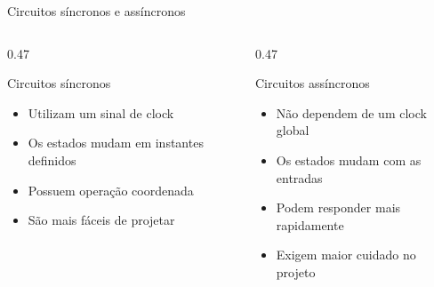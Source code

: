 \begin{frame}{Circuitos síncronos e assíncronos}

    \begin{columns}[T]

        \begin{column}{0.47\textwidth}
            \begin{alertblock}{Circuitos síncronos}
                \begin{itemize}
                    \item Utilizam um sinal de clock
                    \item Os estados mudam em instantes definidos
                    \item Possuem operação coordenada
                    \item São mais fáceis de projetar
                \end{itemize}
            \end{alertblock}
        \end{column}

        \begin{column}{0.47\textwidth}
            \begin{block}{Circuitos assíncronos}
                \begin{itemize}
                    \item Não dependem de um clock global
                    \item Os estados mudam com as entradas
                    \item Podem responder mais rapidamente
                    \item Exigem maior cuidado no projeto
                \end{itemize}
            \end{block}
        \end{column}

    \end{columns}

\end{frame}